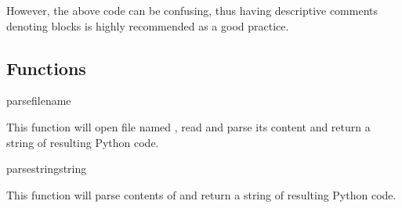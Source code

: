 However, the above code can be confusing, thus having descriptive
comments denoting blocks is highly recommended as a good practice.

\subsection{Functions\label{pyapi-psp-funcs}}

\begin{funcdesc}{parse}{filename}

This function will open file named , read and parse its
content and return a string of resulting Python code.

\end{funcdesc}

\begin{funcdesc}{parsestring}{string}

This function will parse contents of  and return a string
of resulting Python code.

\end{funcdesc}


